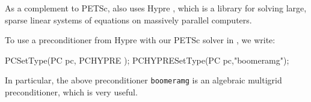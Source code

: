 As a complement to PETSc, \dolfin{} also uses Hypre \cite{www:hypre}, which is a 
library for solving large, sparse linear systems of equations on 
massively parallel computers. 

To use a preconditioner from Hypre with our PETSc solver in \dolfin{}, we write:  
%
\begin{code}
PCSetType(PC pc, PCHYPRE );
PCHYPRESetType(PC pc,"boomeramg");
\end{code}

In particular, the above preconditioner \texttt{boomeramg} is an algebraic multigrid 
preconditioner, which is very useful. 

